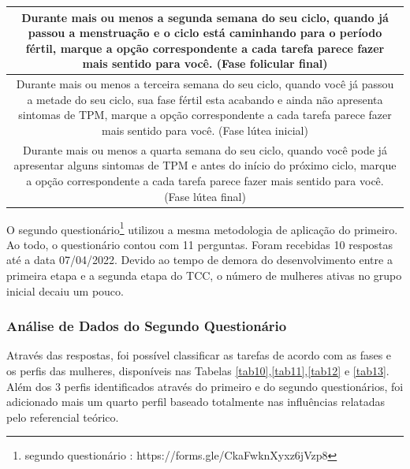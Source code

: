 \begin{table}[ht]
\begin{tabular}{c}
        \midrule
        \begin{minipage} [t] {1\textwidth} Durante mais ou menos a segunda semana do seu ciclo, quando já passou a menstruação e o ciclo está caminhando para o período fértil, marque a opção correspondente a cada tarefa parece fazer mais sentido para você. (Fase folicular final)\end{minipage}\\
        \midrule
        \begin{minipage} [t] {1\textwidth} Durante mais ou menos a terceira semana do seu ciclo, quando você já passou a metade do seu ciclo, sua fase fértil esta acabando e ainda não apresenta sintomas de TPM, marque a opção correspondente a cada tarefa parece fazer mais sentido para você. (Fase lútea inicial) \end{minipage}\\
        \midrule
        \begin{minipage} [t] {1\textwidth} Durante mais ou menos a quarta semana do seu ciclo, quando você pode já apresentar alguns sintomas de TPM e antes do início do próximo ciclo, marque a opção correspondente a cada tarefa parece fazer mais sentido para você. (Fase lútea final) \end{minipage}\\
        \bottomrule
    \end{tabular}
\end{table}


O segundo questionário\footnote{segundo questionário : https://forms.gle/CkaFwknXyxz6jVzp8} 
utilizou a mesma metodologia de aplicação do primeiro.
Ao todo, o questionário contou com 11 perguntas. Foram recebidas 10 respostas até a 
data 07/04/2022. Devido ao tempo de demora do desenvolvimento 
entre a primeira etapa e a segunda etapa do TCC, o número de mulheres ativas no grupo 
inicial decaiu um pouco. 


\subsubsection{Análise de Dados do Segundo Questionário}
\label{vsf2}
Através das respostas, foi possível 
classificar as tarefas de acordo com as fases e os perfis das mulheres, disponíveis nas Tabelas \ref{tab10},\ref{tab11},\ref{tab12} e \ref{tab13}.
Além dos 3 perfis identificados através do primeiro e do segundo questionários, foi adicionado mais um quarto perfil 
baseado totalmente nas influências relatadas pelo referencial teórico. 

